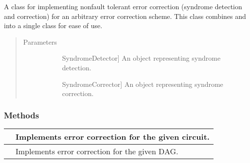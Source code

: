 \documentclass[letterpaper,10pt,english]{sphinxmanual}
\begin{document}
\begin{fulllineitems}
\label{\detokenize{Base:BaseFaultTolerance.ErrorCorrector}}
A class for implementing non\sphinxhyphen{}fault tolerant error correction (syndrome detection and correction) for an arbitrary error correction scheme.
This class combines  and  into a single class for ease of use.
\begin{quote}\begin{description}
\item[{Parameters}] \leavevmode\begin{description}
\item[{}] \leavevmode{[}SyndromeDetector{]}
An object representing syndrome detection.

\item[{}] \leavevmode{[}SyndromeCorrector{]}
An object representing syndrome correction.

\end{description}

\end{description}\end{quote}
\subsubsection*{Methods}


\begin{savenotes}\sphinxattablestart
\centering
\begin{tabulary}{\linewidth}[t]{|T|T|}
\hline

&
Implements error correction for the given circuit.
\\
\hline
{}
&
Implements error correction for the given DAG.
\\
\hline
\end{tabulary}
\par
\sphinxattableend\end{savenotes}


\end{fulllineitems}
\end{document}
